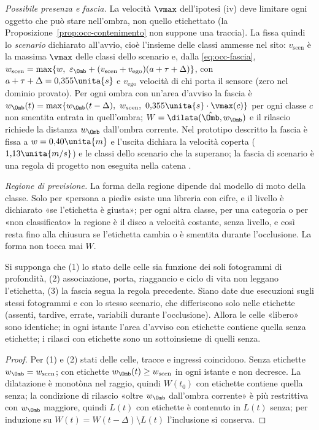 \emph{Possibile presenza e fascia.} La velocità $\vmax$ dell'ipotesi (iv) deve limitare ogni oggetto che può stare nell'ombra, non quello etichettato (la Proposizione~\ref{prop:occ-contenimento} non suppone una traccia). La fissa quindi lo \emph{scenario} dichiarato all'avvio, cioè l'insieme delle classi ammesse nel sito: $v_{\mathrm{scen}}$ è la massima $\vmax$ delle classi dello scenario e, dalla \eqref{eq:occ-fascia}, $w_{\mathrm{scen}}=\max\{w,\ \varepsilon_\Omb+(v_{\mathrm{scen}}+v_{\mathrm{ego}})(a+\tau+\Delta)\}$, con $a+\tau+\Delta=0{,}355\unita{s}$ e $v_{\mathrm{ego}}$ velocità di chi porta il sensore (zero nel dominio provato). Per ogni ombra con un'area d'avviso la fascia è $w_\Omb(t)=\max\{w_\Omb(t-\Delta),\ w_{\mathrm{scen}},\ 0{,}355\unita{s}\cdot\vmax(c)\}$ per ogni classe $c$ non smentita entrata in quell'ombra; $W=\dilata(\hat\Omb,w_\Omb)$ e il rilascio richiede la distanza $w_\Omb$ dall'ombra corrente. Nel prototipo descritto la fascia è fissa a $w=0{,}40\unita{m}$ e l'uscita dichiara la velocità coperta ($1{,}13\unita{m/s}$) e le classi dello scenario che la superano; la fascia di scenario è una regola di progetto non eseguita nella catena .

\emph{Regione di previsione.} La forma della regione dipende dal modello di moto della classe. Solo per «persona a piedi» esiste una libreria con cifre, e il livello è dichiarato «se l'etichetta è giusta»; per ogni altra classe, per una categoria o per «non classificato» la regione è il disco a velocità costante, senza livello, e così resta fino alla chiusura se l'etichetta cambia o è smentita durante l'occlusione. La forma non tocca mai $W$.

\begin{proposizione}\label{prop:occ-etichetta}
Si supponga che (1) lo stato delle celle sia funzione dei soli fotogrammi di profondità, (2) associazione, porta, riaggancio e ciclo di vita non leggano l'etichetta, (3) la fascia segua la regola precedente. Siano date due esecuzioni sugli stessi fotogrammi e con lo stesso scenario, che differiscono solo nelle etichette (assenti, tardive, errate, variabili durante l'occlusione). Allora le celle «libero» sono identiche; in ogni istante l'area d'avviso con etichette contiene quella senza etichette; i rilasci con etichette sono un sottoinsieme di quelli senza. 
\end{proposizione}
\begin{proof}
Per (1) e (2) stati delle celle, tracce e ingressi coincidono. Senza etichette $w_\Omb=w_{\mathrm{scen}}$; con etichette $w_\Omb(t)\ge w_{\mathrm{scen}}$ in ogni istante e non decresce. La dilatazione è monotòna nel raggio, quindi $W(t_0)$ con etichette contiene quella senza; la condizione di rilascio «oltre $w_\Omb$ dall'ombra corrente» è più restrittiva con $w_\Omb$ maggiore, quindi $L(t)$ con etichette è contenuto in $L(t)$ senza; per induzione su $W(t)=W(t-\Delta)\setminus L(t)$ l'inclusione si conserva.
\end{proof}

